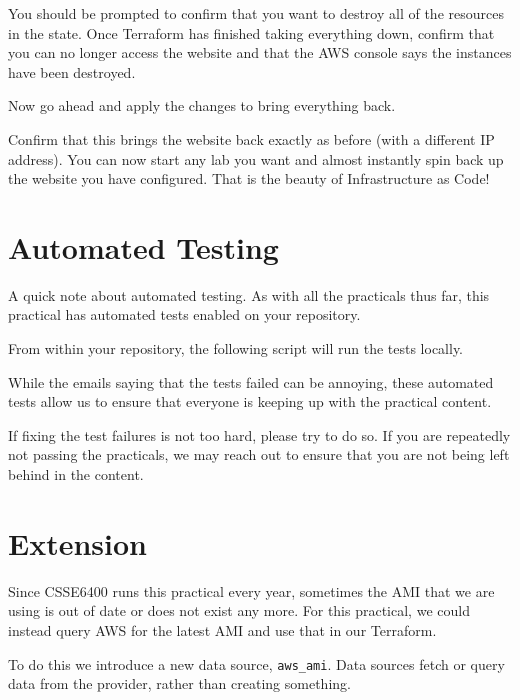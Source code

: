 \documentclass{csse4400}
\begin{document}
You should be prompted to confirm that you want to destroy all of the resources in the state.
Once Terraform has finished taking everything down,
confirm that you can no longer access the website and that the AWS console says the instances have been destroyed.

Now go ahead and apply the changes to bring everything back.

Confirm that this brings the website back exactly as before (with a different IP address).
You can now start any lab you want and almost instantly spin back up the website you have configured.
That is the beauty of Infrastructure as Code!



\section{Automated Testing}
A quick note about automated testing.
As with all the practicals thus far,
this practical has automated tests enabled on your repository.

From within your repository, the following script will run the tests locally.

While the emails saying that the tests failed can be annoying,
these automated tests allow us to ensure that everyone is keeping up with the practical content.

If fixing the test failures is not too hard,
please try to do so.
If you are repeatedly not passing the practicals,
we may reach out to ensure that you are not being left behind in the content.


\section{Extension}


Since CSSE6400 runs this practical every year, sometimes the AMI that we are using is out of date or does not exist any more.
For this practical, we could instead query AWS for the latest AMI and use that in our Terraform.

To do this we introduce a new data source, \texttt{aws\_ami}.
Data sources fetch or query data from the provider, rather than creating something.
\end{document}
